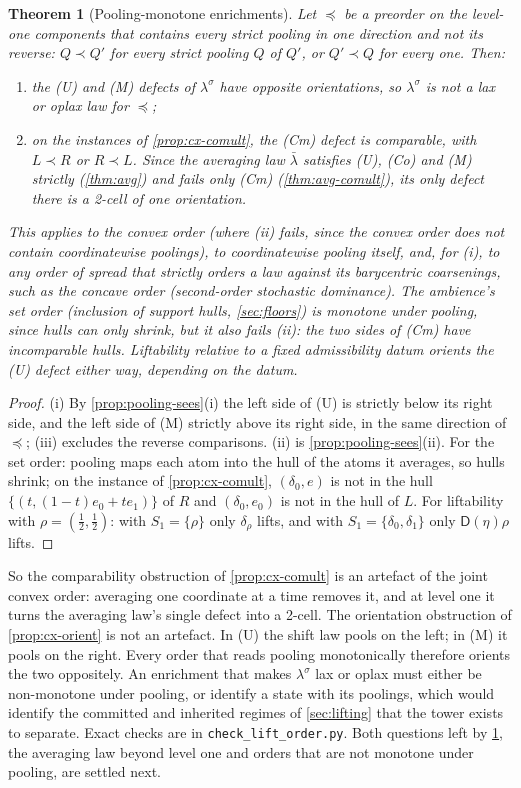 \documentclass[11pt]{article}
\newtheorem{theorem}{Theorem}[section]
\theoremstyle{definition}
\theoremstyle{remark}
\newcommand{\D}{\mathsf{D}}
\newcommand{\lb}{\bar\lambda}
\newcommand{\ls}{\lambda^{\sigma}}
\begin{document}
\begin{theorem}[Pooling-monotone enrichments]\label{thm:pooling-monotone}
Let $\preceq$ be a preorder on the level-one components that contains every strict pooling in one direction and not its reverse:
$Q\prec Q'$ for every strict pooling $Q$ of $Q'$, or $Q'\prec Q$ for every one. Then:
\begin{enumerate}[label=(\roman*)]
\item the (U) and (M) defects of $\ls$ have opposite orientations, so $\ls$ is not a lax or oplax law for $\preceq$;
\item on the instances of \cref{prop:cx-comult}, the (Cm) defect is comparable, with $L\prec R$ or $R\prec L$. Since the averaging law
  $\lb$ satisfies (U), (Co) and (M) strictly (\cref{thm:avg}) and fails only (Cm) (\cref{thm:avg-comult}), its only defect there is a 2-cell of one orientation.
\end{enumerate}
This applies to the convex order (where (ii) fails, since the convex order does not contain coordinatewise poolings), to
coordinatewise pooling itself, and, for (i), to any order of spread that strictly orders a law against its barycentric
coarsenings, such as the concave order (second-order stochastic dominance). The ambience's set order (inclusion of support hulls,
\cref{sec:floors}) is monotone under pooling, since hulls can only shrink, but it also fails (ii): the two sides of (Cm) have
incomparable hulls. Liftability relative to a fixed admissibility datum orients the (U) defect either way, depending on the datum.
\end{theorem}
\begin{proof}
(i) By \cref{prop:pooling-sees}(i) the left side of (U) is strictly below its right side, and the left side of (M) strictly above
its right side, in the same direction of $\preceq$; (iii) excludes the reverse comparisons. (ii) is \cref{prop:pooling-sees}(ii).
For the set order: pooling maps each atom into the hull of the atoms it averages, so hulls shrink; on the instance of
\cref{prop:cx-comult}, $(\delta_0,e)$ is not in the hull $\{(t,(1-t)e_0+te_1)\}$ of $R$ and $(\delta_0,e_0)$ is not in the hull of $L$. For
liftability with $\rho=(\tfrac12,\tfrac12)$: with $S_1=\{\rho\}$ only $\delta_\rho$ lifts, and with $S_1=\{\delta_0,\delta_1\}$ only
$\D(\eta)\rho$ lifts.
\end{proof}

So the comparability obstruction of \cref{prop:cx-comult} is an artefact of the joint convex order: averaging one coordinate at a
time removes it, and at level one it turns the averaging law's single defect into a 2-cell. The orientation obstruction of
\cref{prop:cx-orient} is not an artefact. In (U) the shift law pools on the left; in (M) it pools on the right. Every order that
reads pooling monotonically therefore orients the two oppositely. An enrichment that makes $\ls$ lax or oplax must either be
non-monotone under pooling, or identify a state with its poolings, which would identify the committed and inherited regimes of
\cref{sec:lifting} that the tower exists to separate. Exact checks are in \texttt{check\_lift\_order.py}. Both questions
left by \cref{thm:pooling-monotone}, the averaging law beyond level one and orders that are not monotone under pooling, are settled
next.
\end{document}
